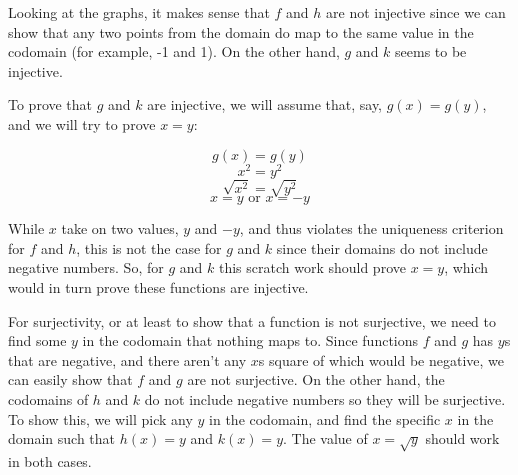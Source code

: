 \documentclass{amsart}
\theoremstyle{definition}
\theoremstyle{definition}
\theoremstyle{remark}
\begin{document}
Looking at the graphs, it makes sense that $f$ and $h$ are not injective since we can show that any two points from the domain do map to the same value in the codomain (for example, -1 and 1). On the other hand, $g$ and $k$ seems to be injective.


To prove that $g$ and $k$ are injective, we will assume that, say, $g(x)=g(y)$, and we will try to prove $x=y$:

\[ g(x) = g(y)\]
\[ x^2 = y^2 \]
\[ \sqrt{x^2} = \sqrt{y^2} \]
\[x = y \text{ or } x=-y\]

While $x$ take on two values, $y$ and $-y$, and thus violates the uniqueness criterion for $f$ and $h$, this is not the case for $g$ and $k$ since their domains do not include negative numbers. So, for $g$ and $k$ this scratch work should prove $x=y$, which would in turn prove these functions are injective.


For surjectivity, or at least to show that a function is not surjective, we need to find some $y$ in the codomain that nothing maps to. Since functions $f$ and $g$ has $y$s that are negative, and there aren't any $x$s square of which would be negative, we can easily show that $f$ and $g$ are not surjective. On the other hand, the codomains of $h$ and $k$ do not include negative numbers so they will be surjective. To show this, we will pick any $y$ in the codomain, and find the specific $x$ in the domain such that $h(x)=y$ and $k(x)=y$. The value of $x = \sqrt{y}$ should work in both cases.
\end{document}
